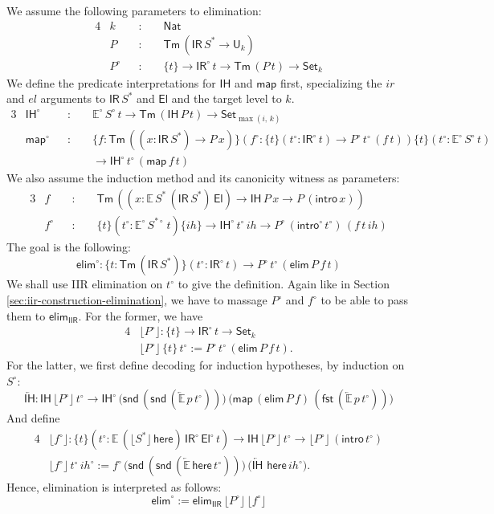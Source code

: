 \documentclass[acmsmall,screen,review]{acmart}
\newcommand{\msf}[1]{{\mathsf{#1}}}
\newcommand{\mbb}[1]{\mathbb{#1}}
\newcommand{\U}{\msf{U}}
\newcommand{\Set}{\msf{Set}}
\newcommand{\Nat}{\msf{Nat}}
\newcommand{\El}{\msf{El}}
\newcommand{\ir}{{ir}}
\newcommand{\el}{{el}}
\newcommand{\IR}{\msf{IR}}
\newcommand{\ih}{{ih}}
\newcommand{\intro}{\msf{intro}}
\newcommand{\IH}{\msf{IH}}
\newcommand{\map}{\msf{map}}
\newcommand{\elim}{\msf{elim}}
\newcommand{\fst}{\msf{fst}}
\newcommand{\snd}{\msf{snd}}
\newcommand{\IIR}{\msf{IIR}}
\newcommand{\floord}[1]{\lfloor #1 \rfloor}
\newcommand{\ola}[1]{\overleftarrow{#1}}
\newcommand{\Tm}{\msf{Tm}}
\newcommand{\w}{\circ}
\newcommand{\here}{\msf{here}}
\newcommand{\E}{\mbb{E}}
\begin{document}
\begin{definition}[Interpretation of $\elim$] \label{def:ir-canonicity-elim}
We assume the following parameters to elimination:
\begin{alignat*}{4}
  &k    &&:\,\,&&\Nat\\
  &P    &&:&& \Tm\,(\IR\,S^* \to \U_k)\\
  &P^\w &&:&& \{t\} \to \IR^\w\,t \to \Tm\,(P\,t) \to \Set_k
\end{alignat*}
We define the predicate interpretations for $\IH$ and $\map$ first, specializing the $\ir$ and $\el$
arguments to $\IR\,S^*$ and $\El$ and the target level to $k$.
\begin{alignat*}{3}
  &\IH^\w  &&:\,\,&& \E^\w\,S^\w\,t \to \Tm\,(\IH\,P\,t) \to \Set_{\max(i,\,k)}\\
  &\map^\w &&:\,\,&& \{f : \Tm\,((x : \IR\,S^*) \to P\,x)\}(f^\w : \{t\}(t^\w : \IR^\w\,t) \to P^\w\,t^\w\,(f\,t))\{t\}(t^\w : \E^\w\,S^\w\,t)\\
  &        &&    &&  \to \IH^\w\,t^\w\,(\map\,f\,t)
\end{alignat*}
We also assume the induction method and its canonicity witness as parameters:
\begin{alignat*}{3}
  &f    &&:\,\,&& \Tm\,((x : \E\,S^*\,(\IR\,S^*)\,\El) \to \IH\,P\,x \to P\,(\intro\,x))\\
  &f^\w &&:\,\,&& \{t\}(t^\w : \E^\w\,S^{*\w}\,t)\{\ih\} \to \IH^\w\,t^\w\,\ih \to P^\w\,(\intro^\w\,t^\w)\,(f\,t\,\ih)
\end{alignat*}
The goal is the following:
\[ \elim^\w : \{t : \Tm\,(\IR\,S^*)\}(t^\w : \IR^\w\,t) \to P^\w\,t^\w\,(\elim\,P\,f\,t)  \]
We shall use IIR elimination on $t^\w$ to give the definition. Again like in Section \ref{sec:iir-construction-elimination}, we
have to massage $P^\w$ and $f^\w$ to be able to pass them to $\elim_\IIR$. For the former, we have
\begin{alignat*}{4}
  &\floord{P^\w} : \{t\} \to \IR^\w\,t \to \Set_k\\
  &\floord{P^\w}\,\{t\}\,t^\w := P^\w\,t^\w\,(\elim\,P\,f\,t).
\end{alignat*}
For the latter, we first define decoding for induction hypotheses, by induction
on $S^\w$:
\[ \ola{\IH} : \IH\,\floord{P^\w}\,t^\w \to
      \IH^\w\,\big(\snd\,(\snd\,(\ola{\E}\,p\,t^\w))\big)\,\big(\map\,(\elim\,P\,f)\,(\fst\,(\ola{\E}\,p\,t^\w))\big) \]
And define
\begin{alignat*}{4}
  &\floord{f^\w} : \{t\}(t^\w : \E\,(\floord{S^*}\,\here)\,\IR^\w\,\El^\w\,t) \to \IH\,\floord{P^\w}\,t^\w \to \floord{P^\w}\,(\intro\,t^\w)\\
  &\floord{f^\w}\,t^\w\,\ih^\w := f^\w\,\big(\snd\,(\snd\,(\ola{\E}\,\here\,t^\w))\big)\,\big(\ola{\IH}\,\,\here\,\ih^\w\big).
\end{alignat*}
Hence, elimination is interpreted as follows:
\[ \elim^\w := \elim_\IIR\,\floord{P^\w}\,\floord{f^\w} \]
\end{definition}
\end{document}
